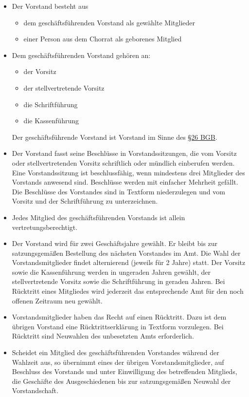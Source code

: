 \documentclass[12pt,paper=a4,ngerman]{report}
\begin{document}
\begin{itemize}
    \item Der Vorstand besteht aus
    \begin{itemize}
        \item dem geschäftsführenden Vorstand als gewählte Mitglieder
        \item einer Person aus dem Chorrat als geborenes Mitglied
    \end{itemize}
    \item Dem geschäftsführenden Vorstand gehören an:
    \begin{itemize}
        \item der Vorsitz
        \item der stellvertretende Vorsitz
        \item die Schriftführung
        \item die Kassenführung
    \end{itemize}
    Der geschäftsführende Vorstand ist Vorstand im Sinne des \href{https://www.gesetze-im-internet.de/bgb/__26.html}{§26 BGB}.
    \item Der Vorstand fasst seine Beschlüsse in Vorstandssitzungen, die vom Vorsitz oder stellvertretenden Vorsitz schriftlich oder mündlich einberufen werden. Eine Vorstandssitzung ist beschlussfähig, wenn mindestens drei Mitglieder des Vorstands anwesend sind. Beschlüsse werden mit einfacher Mehrheit gefällt. Die Beschlüsse des Vorstandes sind in Textform niederzulegen und vom Vorsitz und der Schriftführung zu unterzeichnen.
    \item Jedes Mitglied des geschäftsführenden Vorstands ist allein vertretungsberechtigt.
    \item Der Vorstand wird für zwei Geschäftsjahre gewählt. Er bleibt bis zur satzungsgemäßen Bestellung des nächsten Vorstandes im Amt. Die Wahl der Vorstandsmitglieder findet alternierend (jeweils für 2 Jahre) statt. Der Vorsitz sowie die Kassenführung werden in ungeraden Jahren gewählt, der stellvertretende Vorsitz sowie die Schriftführung in geraden Jahren. Bei Rücktritt eines Mitgliedes wird jederzeit das entsprechende Amt für den noch offenen Zeitraum neu gewählt.
    \item Vorstandsmitglieder haben das Recht auf einen Rücktritt. Dazu ist dem übrigen Vorstand eine Rücktrittserklärung in Textform vorzulegen. Bei Rücktritt sind Neuwahlen des unbesetzten Amts erforderlich.
    \item Scheidet ein Mitglied des geschäftsführenden Vorstandes während der Wahlzeit aus, so übernimmt eines der übrigen Vorstandsmitglieder, auf Beschluss des Vorstands und unter Einwilligung des betreffenden Mitglieds, die Geschäfte des Ausgeschiedenen bis zur satzungsgemäßen Neuwahl der Vorstandschaft.
\end{itemize}
\end{document}
